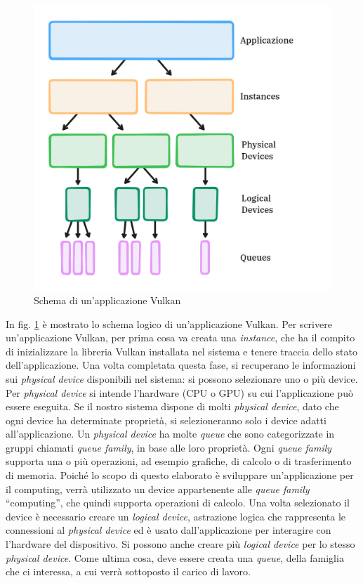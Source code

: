 \begin{figure}[ht]
    \centering
    \includegraphics[width=.9\linewidth]{images/chapter2/vulkan_scheme.png}
    \caption{Schema di un'applicazione Vulkan}
    \label{fig:vulkan_scheme}
\end{figure}

In fig. \ref{fig:vulkan_scheme} è mostrato lo schema logico di un'applicazione Vulkan. 
Per scrivere un'applicazione Vulkan, per prima cosa va creata una \textit{instance}, che ha il compito di inizializzare la libreria Vulkan installata nel sistema e tenere traccia dello stato dell'applicazione. Una volta completata questa fase, si recuperano le informazioni sui \textit{physical device} disponibili nel sistema: si possono selezionare uno o più device. Per \textit{physical device} si intende l'hardware (CPU o GPU) su cui l'applicazione può essere eseguita. Se il nostro sistema dispone di molti \textit{physical device}, dato che ogni device ha determinate proprietà, si selezioneranno solo i device adatti all'applicazione. Un \textit{physical device} ha molte \textit{queue} che sono categorizzate in gruppi chiamati \textit{queue family}, in base alle loro proprietà. Ogni \textit{queue family} supporta una o più operazioni, ad esempio grafiche, di calcolo o di trasferimento di memoria. Poiché lo scopo di questo elaborato è sviluppare un'applicazione per il computing, verrà utilizzato un device appartenente alle \textit{queue family} ``computing'', che quindi supporta operazioni di calcolo. Una volta selezionato il device è necessario creare un \textit{logical device}, astrazione logica che rappresenta le connessioni al \textit{physical device} ed è usato dall'applicazione per interagire con l'hardware del dispositivo. Si possono anche creare più \textit{logical device} per lo stesso \textit{physical device}. Come ultima cosa, deve essere creata una \textit{queue}, della famiglia che ci interessa, a cui verrà sottoposto il carico di lavoro.

